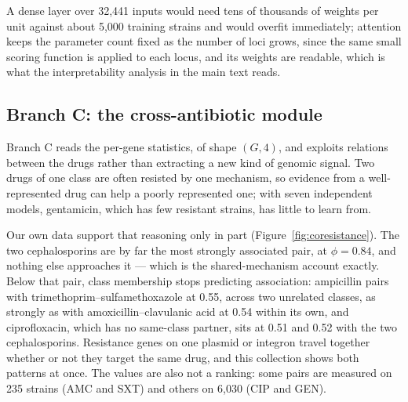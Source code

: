 \documentclass[11pt]{article}
\begin{document}
A dense layer over 32,441 inputs would need tens of thousands of weights per unit against about
5,000 training strains and would overfit immediately; attention keeps the parameter count fixed as
the number of loci grows, since the same small scoring function is applied to each locus, and its
weights are readable, which is what the interpretability analysis in the main text reads.

\subsection{Branch C: the cross-antibiotic module}
Branch C reads the per-gene statistics, of shape $(G, 4)$, and exploits relations between the drugs
rather than extracting a new kind of genomic signal. Two drugs of one class are often resisted by
one mechanism, so evidence from a well-represented drug can help a poorly represented one; with
seven independent models, gentamicin, which has few resistant strains, has little to learn from.

Our own data support that reasoning only in part (Figure~\ref{fig:coresistance}). The two
cephalosporins are by far the most strongly associated pair, at $\phi = 0.84$, and nothing else
approaches it --- which is the shared-mechanism account exactly. Below that pair, class membership
stops predicting association: ampicillin pairs with trimethoprim--sulfamethoxazole at 0.55, across
two unrelated classes, as strongly as with amoxicillin--clavulanic acid at 0.54 within its own, and
ciprofloxacin, which has no same-class partner, sits at 0.51 and 0.52 with the two cephalosporins.
Resistance genes on one plasmid or integron travel together whether or not they target the same
drug, and this collection shows both patterns at once. The values are also not a ranking: some pairs
are measured on 235 strains (AMC and SXT) and others on 6,030 (CIP and GEN).
\end{document}
